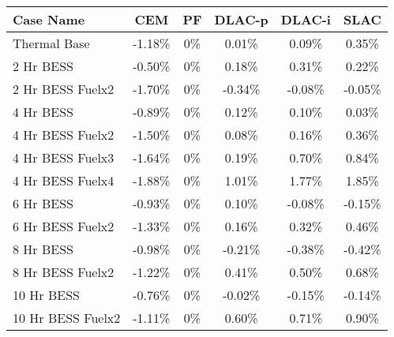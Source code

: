\begin{tabular}{lccccc}
\toprule
Case Name & CEM & PF & DLAC-p & DLAC-i & SLAC \\
\midrule
Thermal Base & -1.18\% & 0\% & 0.01\% & 0.09\% & 0.35\% \\
2 Hr BESS & -0.50\% & 0\% & 0.18\% & 0.31\% & 0.22\% \\
2 Hr BESS Fuelx2 & -1.70\% & 0\% & -0.34\% & -0.08\% & -0.05\% \\
4 Hr BESS & -0.89\% & 0\% & 0.12\% & 0.10\% & 0.03\% \\
4 Hr BESS Fuelx2 & -1.50\% & 0\% & 0.08\% & 0.16\% & 0.36\% \\
4 Hr BESS Fuelx3 & -1.64\% & 0\% & 0.19\% & 0.70\% & 0.84\% \\
4 Hr BESS Fuelx4 & -1.88\% & 0\% & 1.01\% & 1.77\% & 1.85\% \\
6 Hr BESS & -0.93\% & 0\% & 0.10\% & -0.08\% & -0.15\% \\
6 Hr BESS Fuelx2 & -1.33\% & 0\% & 0.16\% & 0.32\% & 0.46\% \\
8 Hr BESS & -0.98\% & 0\% & -0.21\% & -0.38\% & -0.42\% \\
8 Hr BESS Fuelx2 & -1.22\% & 0\% & 0.41\% & 0.50\% & 0.68\% \\
10 Hr BESS & -0.76\% & 0\% & -0.02\% & -0.15\% & -0.14\% \\
10 Hr BESS Fuelx2 & -1.11\% & 0\% & 0.60\% & 0.71\% & 0.90\% \\
\bottomrule
\end{tabular}
